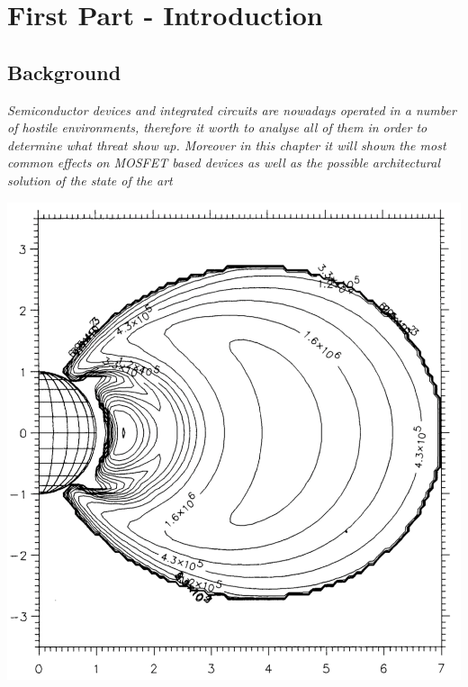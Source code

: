 \documentclass[./dissertation.tex]{subfiles}
\begin{document}
\newpage\null\thispagestyle{empty}\newpage

\part{First Part - Introduction}
\chapter{Background}
\label{chap:fond}

\begin{minipage}{12cm}\textit{Semiconductor devices and integrated circuits are nowadays operated in a number of hostile environments, therefore it worth to analyse all of them in order to determine what threat show up. Moreover in this chapter it will shown the most common effects on MOSFET based devices as well as the possible architectural solution of the state of the art}

\end{minipage}

\vspace{1.30cm}
\begin{center}
    \includegraphics[scale=0.40]{Figures/radiation.png}
\end{center}
\vspace*{1cm}
\newpage
\end{document}

